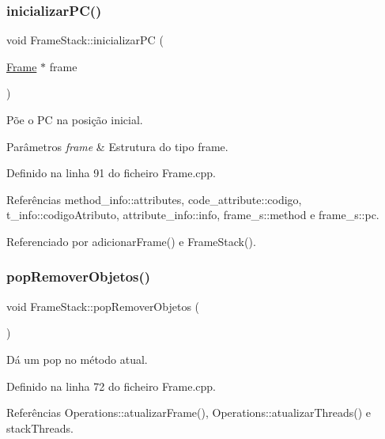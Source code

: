 \subsubsection{\texorpdfstring{inicializar\+P\+C()}{inicializarPC()}}
{\footnotesize\ttfamily void Frame\+Stack\+::inicializar\+PC (\begin{DoxyParamCaption}\item[{\hyperlink{Frame_8h_acc380914b41a084dcc8e4b38fb200145}{Frame} $\ast$}]{frame }\end{DoxyParamCaption})\hspace{0.3cm}{\ttfamily [private]}}



Põe o PC na posição inicial. 


\begin{DoxyParams}{Parâmetros}
{\em frame} & Estrutura do tipo frame. \\
\hline
\end{DoxyParams}


Definido na linha 91 do ficheiro Frame.\+cpp.



Referências method\+\_\+info\+::attributes, code\+\_\+attribute\+::codigo, t\+\_\+info\+::codigo\+Atributo, attribute\+\_\+info\+::info, frame\+\_\+s\+::method e frame\+\_\+s\+::pc.



Referenciado por adicionar\+Frame() e Frame\+Stack().

\mbox{\label{classFrameStack_a95dd5d1d253758f1fa7a4a2371ff1545}} 
\subsubsection{\texorpdfstring{pop\+Remover\+Objetos()}{popRemoverObjetos()}}
{\footnotesize\ttfamily void Frame\+Stack\+::pop\+Remover\+Objetos (\begin{DoxyParamCaption}{ }\end{DoxyParamCaption})}



Dá um pop no método atual. 



Definido na linha 72 do ficheiro Frame.\+cpp.



Referências Operations\+::atualizar\+Frame(), Operations\+::atualizar\+Threads() e stack\+Threads.



